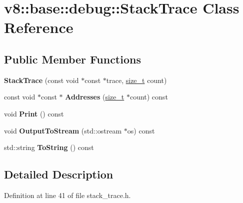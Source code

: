 \hypertarget{classv8_1_1base_1_1debug_1_1StackTrace}{}\section{v8\+:\+:base\+:\+:debug\+:\+:Stack\+Trace Class Reference}
\label{classv8_1_1base_1_1debug_1_1StackTrace}
\subsection*{Public Member Functions}
\begin{DoxyCompactItemize}
\item 
\mbox{\label{classv8_1_1base_1_1debug_1_1StackTrace_ad26352d5fa37f87ffb8ed1904c8a21e0}} 
{\bfseries Stack\+Trace} (const void $\ast$const $\ast$trace, \mbox{\hyperlink{classsize__t}{size\+\_\+t}} count)
\item 
\mbox{\label{classv8_1_1base_1_1debug_1_1StackTrace_a67f157a46da73b0a1b32fb376c9775a8}} 
const void $\ast$const  $\ast$ {\bfseries Addresses} (\mbox{\hyperlink{classsize__t}{size\+\_\+t}} $\ast$count) const
\item 
\mbox{\label{classv8_1_1base_1_1debug_1_1StackTrace_a783b7cf0f5190b6f5fe2c888b4cff2cc}} 
void {\bfseries Print} () const
\item 
\mbox{\label{classv8_1_1base_1_1debug_1_1StackTrace_a21b1d3df259afb289dfb51256efe21cc}} 
void {\bfseries Output\+To\+Stream} (std\+::ostream $\ast$os) const
\item 
\mbox{\label{classv8_1_1base_1_1debug_1_1StackTrace_a57358ffc35221767c7237bd148e5aa4b}} 
std\+::string {\bfseries To\+String} () const
\end{DoxyCompactItemize}


\subsection{Detailed Description}


Definition at line 41 of file stack\+\_\+trace.\+h.



